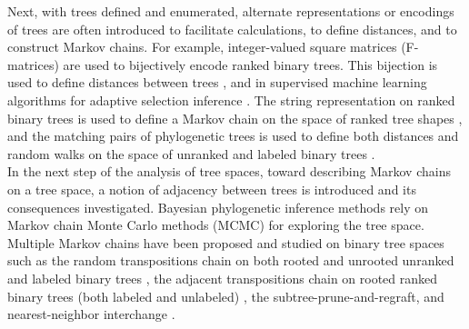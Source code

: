 \documentclass{article}
\begin{document}
Next, with trees defined and enumerated, alternate representations or encodings of trees are often introduced to facilitate calculations, to define distances, and to construct Markov chains. For example, integer-valued square matrices (F-matrices) are used to bijectively encode ranked binary trees. This bijection is used to define distances between trees \citep{Kim2020}, and in supervised machine learning algorithms for adaptive selection inference \citep{mo2023domain}. The string representation on ranked binary trees \citep{donaghey1975alternating} is used to define a Markov chain on the space of ranked tree shapes \citep{samyak2024statistical}, and the matching pairs of phylogenetic trees is used to define both distances and random walks on the space of unranked and labeled binary trees \citep{diaconis1998matchings, diaconis2002,simper2022adjacent}. \\


In the next step of the analysis of tree spaces, toward describing Markov chains on a tree space, a notion of adjacency between trees is introduced and its consequences investigated. Bayesian phylogenetic inference methods rely on Markov chain Monte Carlo methods (MCMC) for exploring the tree space. Multiple Markov chains have been proposed and studied on binary tree spaces such as the random transpositions chain on both rooted and unrooted unranked and labeled binary trees \citep{diaconis1998matchings, aldous2000mixing}, the adjacent transpositions chain on rooted ranked binary trees (both labeled and unlabeled) \citep{simper2022adjacent}, the subtree-prune-and-regraft, and nearest-neighbor interchange \citep{spade2014note}. \\
\end{document}
